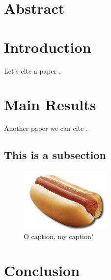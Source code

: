 \section*{Abstract}
  \lipsum[1]

\section{Introduction}
  \lipsum[1]
  Let's cite a paper \cite{BankCVS2011}.

\section{Main Results}
  \lipsum[4]
  Another paper we can cite \cite{Babuska1996}.

  \subsection{This is a subsection}
  \lipsum[1]

  \begin{figure}
    \centering
    \includegraphics[width=0.4\textwidth]{src/paper1/figs/hotdog.png}
    \caption{O caption, my caption!}
  \end{figure}

  \lipsum[2]

\section{Conclusion}
  \lipsum[2]

